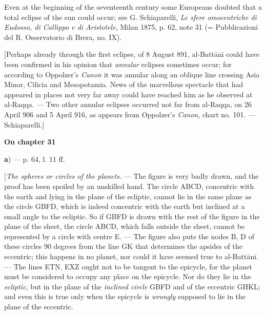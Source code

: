 \documentclass[11pt]{article}
\newcommand{\Pg}[1]{\marginpar{\footnotesize\color{gray}#1}}
\newcommand{\UnitHead}[2]{\par\setcounter{footnoteT}{0}\needspace{8\baselineskip}\bigskip\pdfbookmark[1]{#1}{unit-#2}\hypertarget{EN-#2}{}%
 {\large\bfseries\interlinepenalty=10000 #1\par}\nobreak\medskip}
\begin{document}
\par Even at the beginning of the seventeenth century some Europeans doubted that a total eclipse of the sun could occur; see G. Schiaparelli, \emph{Le sfere omocentriche di Eudosso, di Callippo e di Aristotele}, Milan 1875, p. 62, note 31 (= Pubblicazioni del R. Osservatorio di Brera, no. IX).\par
\par \Pg{I 237}[Perhaps already through the first eclipse, of 8 August 891, al-Battānī could have been confirmed in his opinion that \emph{annular} eclipses sometimes occur; for according to Oppolzer's \emph{Canon} it was annular along an oblique line crossing Asia Minor, Cilicia and Mesopotamia. News of the marvellous spectacle that had appeared in places not very far away could have reached him as he observed at al-Raqqa. — Two other annular eclipses occurred not far from al-Raqqa, on 26 April 906 and 5 April 916, as appears from Oppolzer's \emph{Canon}, chart no. 101. — Schiaparelli.]\par
\UnitHead{On chapter 31}{A31}
\par\begin{center}\textbf{a}) — p. 64, l. 11 ff.\end{center}
\par [\emph{The spheres or circles of the planets.} — The figure is very badly drawn, and the proof has been spoiled by an unskilled hand. The circle ABCD, concentric with the earth and lying in the plane of the ecliptic, cannot lie in the same plane as the circle GBFD, which is indeed concentric with the earth but inclined at a small angle to the ecliptic. So if GBFD is drawn with the rest of the figure in the plane of the sheet, the circle ABCD, which falls outside the sheet, cannot be represented by a circle with centre E. — The figure also puts the nodes B, D of these circles 90 degrees from the line GK that determines the apsides of the eccentric; this happens in no planet, nor could it have seemed true to al-Battānī. — The lines ETN, EXZ ought not to be tangent to the epicycle, for the planet must be considered to occupy any place on the epicycle. Nor do they lie in the \emph{ecliptic}, but in the plane of the \emph{inclined circle} GBFD and of the eccentric GHKL; and even this is true only when the epicycle is \emph{wrongly} supposed to lie in the plane of the eccentric.\par
\begin{center}\end{center}
\end{document}
